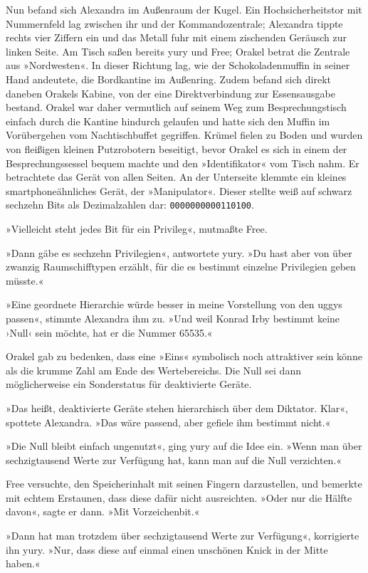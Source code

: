 Nun befand sich Alexandra im Außenraum der Kugel. Ein Hochsicherheitstor mit Nummernfeld lag zwischen ihr und der Kommandozentrale; Alexandra tippte rechts vier Ziffern ein und das Metall fuhr mit einem zischenden Geräusch zur linken Seite. Am Tisch saßen bereits yury und Free; Orakel betrat die Zentrale aus »Nordwesten«. In dieser Richtung lag, wie der Schokoladenmuffin in seiner Hand andeutete, die Bordkantine im Außenring. Zudem befand sich direkt daneben Orakels Kabine, von der eine Direktverbindung zur Essensausgabe bestand. Orakel war daher vermutlich auf seinem Weg zum Besprechungstisch einfach durch die Kantine hindurch gelaufen und hatte sich den Muffin im Vorübergehen vom Nachtischbuffet gegriffen. Krümel fielen zu Boden und wurden von fleißigen kleinen Putzrobotern beseitigt, bevor Orakel es sich in einem der Besprechungssessel bequem machte und den »Identifikator« vom Tisch nahm. Er betrachtete das Gerät von allen Seiten. An der Unterseite klemmte ein kleines smartphoneähnliches Gerät, der »Manipulator«. Dieser stellte weiß auf schwarz sechzehn Bits als Dezimalzahlen dar: \texttt{0000000000110100}.

»Vielleicht steht jedes Bit für ein Privileg«, mutmaßte Free.

»Dann gäbe es sechzehn Privilegien«, antwortete yury. »Du hast aber von über zwanzig Raumschifftypen erzählt, für die es bestimmt einzelne Privilegien geben müsste.«

»Eine geordnete Hierarchie würde besser in meine Vorstellung von den uggys passen«, stimmte Alexandra ihm zu. »Und weil Konrad Irby bestimmt keine ›Null‹ sein möchte, hat er die Nummer 65535.«

Orakel gab zu bedenken, dass eine »Eins« symbolisch noch attraktiver sein könne als die krumme Zahl am Ende des Wertebereichs. Die Null sei dann möglicherweise ein Sonderstatus für deaktivierte Geräte.

»Das heißt, deaktivierte Geräte stehen hierarchisch über dem Diktator. Klar«, spottete Alexandra. »Das wäre passend, aber gefiele ihm bestimmt nicht.«

»Die Null bleibt einfach ungenutzt«, ging yury auf die Idee ein. »Wenn man über sechzigtausend Werte zur Verfügung hat, kann man auf die Null verzichten.«

Free versuchte, den Speicherinhalt mit seinen Fingern darzustellen, und bemerkte mit echtem Erstaunen, dass diese dafür nicht ausreichten. »Oder nur die Hälfte davon«, sagte er dann. »Mit Vorzeichenbit.«

»Dann hat man trotzdem über sechzigtausend Werte zur Verfügung«, korrigierte ihn yury. »Nur, dass diese auf einmal einen unschönen Knick in der Mitte haben.«

